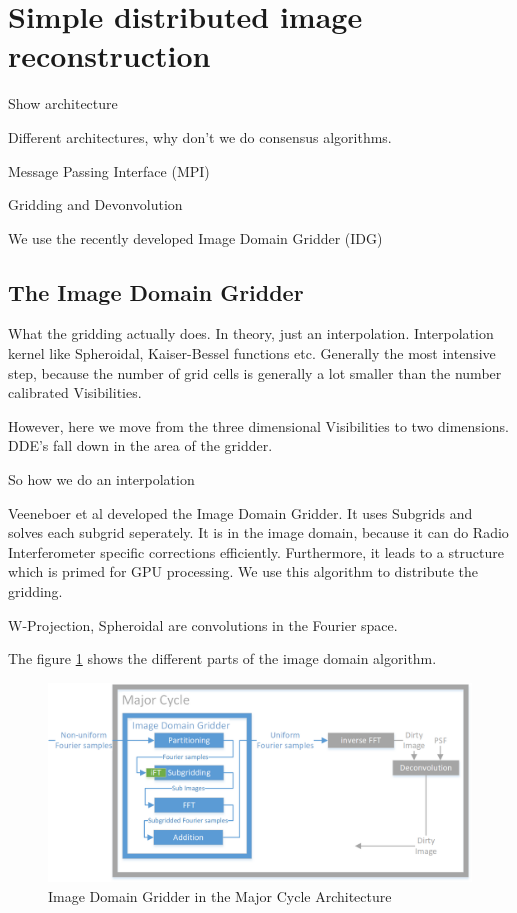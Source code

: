 
\section{Simple distributed image reconstruction}\label{dist}
Show architecture

Different architectures, why don't we do consensus algorithms.

Message Passing Interface (MPI)


Gridding and Devonvolution

We use the recently developed Image Domain Gridder (IDG) 


\subsection{The Image Domain Gridder}\label{distribution:idg}

What the gridding actually does. In theory, just an interpolation. Interpolation kernel like Spheroidal, Kaiser-Bessel functions etc. Generally the most intensive step, because the number of grid cells is generally a lot smaller than the number calibrated Visibilities.

However, here we move from the three dimensional Visibilities to two dimensions. DDE's fall down in the area of the gridder.

So how we do an interpolation 

Veeneboer et al\cite{veenboer2017image} developed the Image Domain Gridder. It uses Subgrids and solves each subgrid seperately.
It is in the image domain, because it can do Radio Interferometer specific corrections efficiently. Furthermore, it leads to a structure which is primed for GPU processing.
We use this algorithm to distribute the gridding.

W-Projection, Spheroidal are convolutions in the Fourier space.

The figure \ref{distribution:idg:system} shows the different parts of the image domain algorithm.

\begin{figure}[h]
	\centering
	\includegraphics[width=0.80\linewidth]{./chapters/03.distribution/idg/major-minor-idg.png}
	\caption{Image Domain Gridder in the Major Cycle Architecture}
	\label{distribution:idg:system}
\end{figure}

